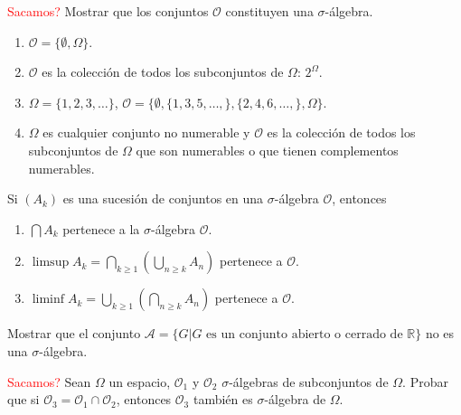 \documentclass{book}
\begin{document}
\begin{ejer}{} \textcolor{red}{Sacamos?}
Mostrar que los conjuntos $ \mathscr{O}$ constituyen una $\sigma$-\'algebra.
\begin{enumerate}
\item $\mathscr{O}=\{\emptyset, \Omega\}$.
\item $\mathscr{O}$ es la colecci\'on de todos los subconjuntos de $\Omega$: $2^{\Omega}$.
\item $\Omega=\{1,2,3,\dots\}$, $\mathscr{O}=\{\emptyset,\{1,3,5,\dots,\},\{2,4,6,\dots,\},\Omega\}$.
\item $\Omega$ es cualquier conjunto no numerable y $\mathscr{O}$ es la colecci\'on de todos los subconjuntos
de $\Omega$ que son numerables o que tienen complementos numerables.
\end{enumerate}
\end{ejer} 


\begin{ejer}{} 
Si $(A_k)$ es una sucesi\'on de conjuntos en una $\sigma$-\'algebra $\mathscr{O}$, entonces
\begin{enumerate}
\item $\bigcap A_k$ pertenece a la $\sigma$-\'algebra $\mathscr{O}$.
\item $\limsup A_k=\bigcap\limits_{k\geq 1}\left(\bigcup\limits_{n\geq k} A_n\right)$ pertenece a $\mathscr{O}$.
\item $\liminf A_k=\bigcup\limits_{k\geq 1}\left(\bigcap\limits_{n\geq k} A_n\right)$ pertenece a $\mathscr{O}$.
 \end{enumerate}
 \end{ejer}  

\begin{ejer}{} 
Mostrar que el conjunto $\mathscr{A}=\{G| G \text{                                                                                                                                                                                                                                     es un conjunto abierto o cerrado de } \mathbb{R}\}$ no es una $\sigma$-álgebra. 
\end{ejer} 

\begin{ejer}{} \textcolor{red}{Sacamos?}
Sean $\Omega$ un espacio, $\mathscr{O}_1$ y  $\mathscr{O}_2$ $\sigma$-\'algebras de subconjuntos de 
$\Omega$. Probar que si $\mathscr{O}_3=\mathscr{O}_1\cap \mathscr{O}_2$, entonces $\mathscr{O}_3$ 
tambi\'en es $\sigma$-\'algebra de $\Omega$. 
\end{ejer} 
\end{document}
